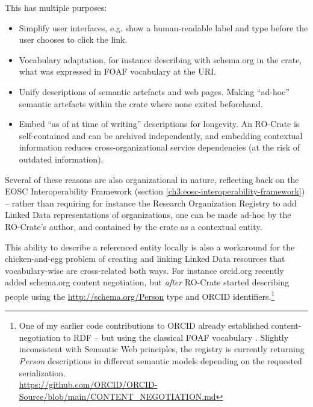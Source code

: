 This has multiple purposes:

\begin{itemize}
    \item Simplify user interfaces, e.g. show a human-readable label and type before the user chooses to click the link.
    \item Vocabulary adaptation, for instance describing with schema.org in the crate, what was expressed in FOAF vocabulary at the URI.
    \item Unify descriptions of semantic artefacts and web pages. 
          Making ``ad-hoc'' semantic artefacts within the crate where none exited beforehand.
    \item Embed ``as of at time of writing'' descriptions for longevity. 
          An RO-Crate is self-contained and can be archived independently, and embedding contextual information reduces cross-organizational service dependencies (at the risk of outdated information).
\end{itemize}

Several of these reasons are also organizational in nature, reflecting back on the EOSC Interoperability Framework (section \vref{ch3:eosc-interoperability-framework}) -- rather than requiring for instance the Research Organization Registry  to add Linked Data representations of organizations, one can be made ad-hoc by the RO-Crate's author, and contained by the crate as a contextual entity. 

This ability to describe a referenced entity locally is also a workaround for the chicken-and-egg problem of creating and linking Linked Data resources that vocabulary-wise are cross-related both ways. For instance orcid.org recently added schema.org content negotiation, but \emph{after} RO-Crate started describing people using the \url{http://schema.org/Person} type and ORCID identifiers.\footnote{
  One of my earlier code contributions to ORCID already established content-negotiation to RDF -- but using the classical FOAF vocabulary \cite{Brickley 2014}.
  Slightly inconsistent with Semantic Web principles\footnotemark, the registry is currently returning \emph{Person} descriptions in different semantic models depending on the requested serialization. \\
  \url{https://github.com/ORCID/ORCID-Source/blob/main/CONTENT_NEGOTIATION.md}} 


